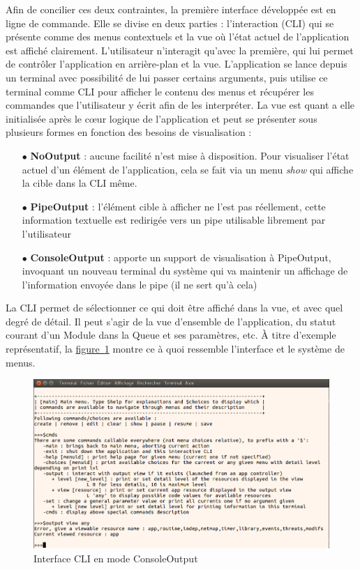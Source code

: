 \documentclass[]{article}
\newcommand{\wordlink}[2]{\hyperref[#1]{#2~\ref{#1}}}
\begin{document}
\par Afin de concilier ces deux contraintes, la première interface développée est en ligne de commande. Elle se divise en deux parties : l'interaction (CLI) qui se présente comme des menus contextuels et la vue où l'état actuel de l'application est affiché clairement. L'utilisateur n'interagit qu'avec la première, qui lui permet de contrôler l'application en arrière-plan et la vue. L'application se lance depuis un terminal avec possibilité de lui passer certains arguments, puis utilise ce terminal comme CLI pour afficher le contenu des menus et récupérer les commandes que l'utilisateur y écrit afin de les interpréter. La vue est quant a elle initialisée après le cœur logique de l'application et peut se présenter sous plusieurs formes  en fonction des besoins de visualisation :
\vspace{0.2cm}
\begin{itemize}
\item[$\bullet$] \textbf{NoOutput} : aucune facilité n'est mise à disposition. Pour visualiser l'état actuel d'un élément de l'application, cela se fait via un menu \textit{show} qui affiche la cible dans la CLI même.
\vspace{0.2cm}
\item[$\bullet$] \textbf{PipeOutput} : l'élément cible à afficher ne l'est pas réellement, cette information textuelle est redirigée vers un pipe utilisable librement par l'utilisateur
\vspace{0.2cm}
\item[$\bullet$] \textbf{ConsoleOutput} : apporte un support de visualisation à PipeOutput, invoquant un nouveau terminal du système qui va maintenir un affichage de l'information envoyée dans le pipe (il ne sert qu'à cela)
\end{itemize}
\vspace{0.2cm}

\par La CLI permet de sélectionner ce qui doit être affiché dans la vue, et avec quel degré de détail. Il peut s'agir de la vue d'ensemble de l'application, du statut courant d'un Module dans la Queue et ses paramètres, etc. À titre d'exemple représentatif, la \wordlink{cli}{figure} montre ce à quoi ressemble l'interface et le système de menus.

\begin{figure}[!ht]
\centering
     \includegraphics[width=0.7\linewidth]{clicmds}
     \caption{Interface CLI en mode ConsoleOutput}
     \label{cli}
\end{figure}
\end{document}

